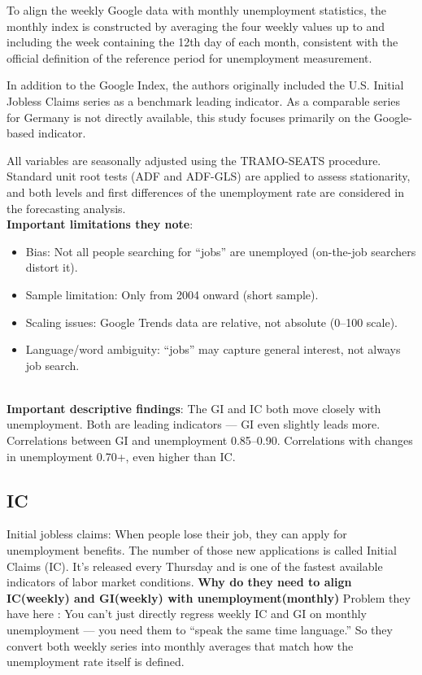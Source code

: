 \documentclass{article}
\begin{document}
To align the weekly Google data with monthly unemployment statistics, the monthly index is constructed by averaging the four weekly values up to and including the week containing the 12th day of each month, consistent with the official definition of the reference period for unemployment measurement. 

In addition to the Google Index, the authors originally included the U.S. Initial Jobless Claims series as a benchmark leading indicator. As a comparable series for Germany is not directly available, this study focuses primarily on the Google-based indicator.

All variables are seasonally adjusted using the TRAMO-SEATS procedure. Standard unit root tests (ADF and ADF-GLS) are applied to assess stationarity, and both levels and first differences of the unemployment rate are considered in the forecasting analysis.
\\
\textbf{Important limitations they note}:
\begin{itemize}
    \item Bias: Not all people searching for “jobs” are unemployed (on-the-job searchers distort it).
    \item Sample limitation: Only from 2004 onward (short sample).
    \item Scaling issues: Google Trends data are relative, not absolute (0–100 scale).
    \item Language/word ambiguity: “jobs” may capture general interest, not always job search.
\end{itemize}
\\
\textbf{Important descriptive findings}:
The GI and IC both move closely with unemployment. Both are leading indicators — GI even slightly leads more. Correlations between GI and unemployment  0.85–0.90. Correlations with changes in unemployment  0.70+, even higher than IC.

\subsection{IC}
Initial jobless claims: When people lose their job, they can apply for unemployment benefits. The number of those new applications is called Initial Claims (IC). It’s released every Thursday and is one of the fastest available indicators of labor market conditions.
\textbf{Why do they need to align IC(weekly) and GI(weekly) with unemployment(monthly)}
Problem they have here : You can’t just directly regress weekly IC and GI on monthly unemployment — you need them to “speak the same time language.” So they convert both weekly series into monthly averages that match how the unemployment rate itself is defined.
\end{document}
